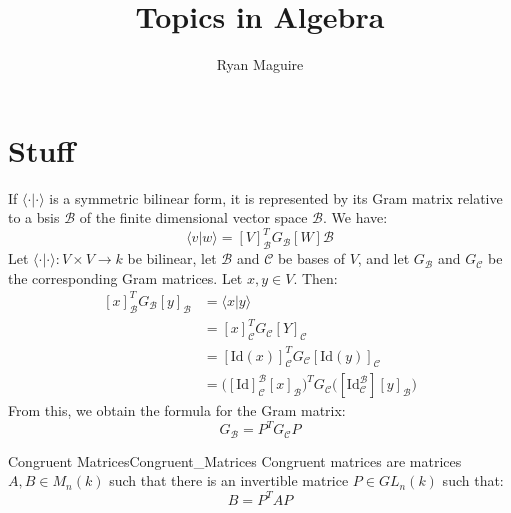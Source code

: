 \documentclass[crop=false,class=article]{standalone}                           %
\begin{document}
    \title{Topics in Algebra}
    \author{Ryan Maguire}
    \date{\vspace{-5ex}}
    \maketitle
    \section{Stuff}
        If $\langle\cdot|\cdot\rangle$ is a symmetric bilinear form, it is
        represented by its Gram matrix relative to a bsis $\mathscr{B}$ of the
        finite dimensional vector space $\mathscr{B}$. We have:
        \begin{equation}
            \langle{v}|w\rangle
            =[V]_{\mathscr{B}}^{T}G_{\mathscr{B}}[W]\mathscr{B}
        \end{equation}
        Let $\langle\cdot|\cdot\rangle:V\times{V}\rightarrow{k}$ be bilinear,
        let $\mathscr{B}$ and $\mathscr{C}$ be bases of $V$, and let
        $G_{\mathscr{B}}$ and $G_{\mathscr{C}}$ be the corresponding Gram
        matrices. Let $x,y\in{V}$. Then:
        \begin{subequations}
            \begin{align}
                [x]_{\mathscr{B}}^{T}G_{\mathscr{B}}[y]_{\mathscr{B}}
                &=\langle{x}|y\rangle\\
                &=[x]_{\mathscr{C}}^{T}G_{\mathscr{C}}[Y]_{\mathscr{C}}\\
                &=[\textrm{Id}(x)]_{\mathscr{C}}^{T}G_{\mathscr{C}}
                    [\textrm{Id}(y)]_{\mathscr{C}}\\
                &=\Big([\textrm{Id}]_{\mathscr{C}}^{\mathscr{B}}
                    [x]_{\mathscr{B}}\Big)^{T}G_{\mathscr{C}}
                    \Big([\textrm{Id}_{\mathscr{C}}^{\mathscr{B}}]
                        [y]_{\mathscr{B}}\Big)
            \end{align}
        \end{subequations}
        From this, we obtain the formula for the Gram matrix:
        \begin{equation}
            G_{\mathscr{B}}=P^{T}G_{\mathscr{C}}P
        \end{equation}
        \begin{fdefinition}{Congruent Matrices}{Congruent_Matrices}
            Congruent matrices are matrices $A,B\in{M}_{n}(k)$ such that there
            is an invertible matrice $P\in{GL}_{n}(k)$ such that:
            \begin{equation}
                B=P^{T}AP
            \end{equation}
        \end{fdefinition}
\end{document}
